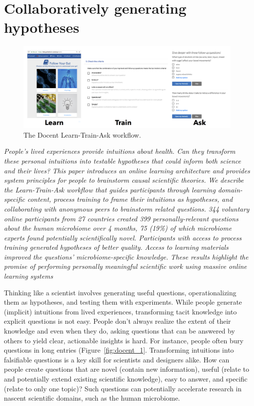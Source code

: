 \chapter{Collaboratively generating hypotheses}
\begin{figure}[h] 
  \centering
  \includegraphics[width=1.0\textwidth]{figures/docent/fig-0.png}
  \caption[The Docent Learn-Train-Ask workflow]
{The Docent Learn-Train-Ask workflow.}
  \label{fig:docent-0}
\end{figure}

\textit{People’s lived experiences provide intuitions about health.
Can they transform these personal intuitions into testable hypotheses
that could inform both science and their lives? This
paper introduces an online learning architecture and provides
system principles for people to brainstorm causal scientific
theories. We describe the Learn-Train-Ask workflow that
guides participants through learning domain-specific content,
process training to frame their intuitions as hypotheses,
and collaborating with anonymous peers to brainstorm related
questions. 344 voluntary online participants from 27
countries created 399 personally-relevant questions about the
human microbiome over 4 months, 75 (19\%) of which microbiome
experts found potentially scientifically novel. Participants
with access to process training generated
hypotheses of better quality. Access to learning materials improved
the questions’ microbiome-specific knowledge.
These results highlight the promise of performing personally 
meaningful scientific work using massive online learning
systems}

Thinking like a scientist involves generating useful questions,
operationalizing them as hypotheses, and testing them
with experiments. While people generate (implicit) intuitions
from lived experiences, transforming tacit knowledge into
explicit questions is not easy. People don’t always realize the
extent of their knowledge and even when they do, asking questions 
that can be answered by others to yield clear, actionable
insights is hard. For instance, people often bury
questions in long entries (Figure~\ref{fig:docent_1}. Transforming intuitions
into falsifiable questions is a key skill for scientists and designers
alike. How can people create questions that are novel
(contain new information), useful (relate to and potentially
extend existing scientific knowledge), easy to answer, and
specific (relate to only one topic)? Such questions can
potentially accelerate research in nascent scientific domains,
such as the human microbiome.

